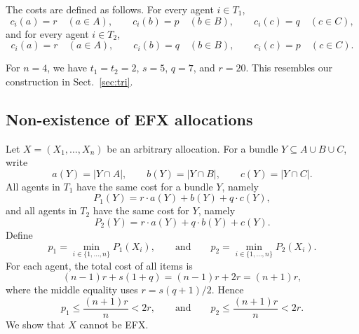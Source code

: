 \documentclass{article}
\theoremstyle{definition}
\begin{document}
The costs are defined as follows. For every agent $i\in T_1$,
\[
    c_i(a)=r \quad(a\in A),
    \qquad
    c_i(b)=p \quad(b\in B),
    \qquad
    c_i(c)=q \quad(c\in C),
\]
and for every agent $i\in T_2$,
\[
    c_i(a)=r \quad(a\in A),
    \qquad
    c_i(b)=q \quad(b\in B),
    \qquad
    c_i(c)=p \quad(c\in C).
\]

For $n=4$, we have $t_1=t_2=2$, $s=5$, $q=7$, and $r=20$.
This resembles our construction in Sect.~\ref{sec:tri}.

\subsection{Non-existence of EFX allocations}
Let $X=(X_1,\ldots,X_n)$ be an arbitrary allocation. For a bundle $Y\subseteq A\cup B\cup C$, write
\[
    a(Y)=|Y\cap A|,
    \qquad
    b(Y)=|Y\cap B|,
    \qquad
    c(Y)=|Y\cap C|.
\]
All agents in $T_1$ have the same cost for a bundle $Y$, namely
\[
    P_1(Y)=r\cdot a(Y)+b(Y)+q\cdot c(Y),
\]
and all agents in $T_2$ have the same cost for $Y$, namely
\[
    P_2(Y)=r\cdot  a(Y)+q\cdot b(Y)+c(Y).
\]
Define
\[
    p_1=\min_{i\in \{1,\ldots,n\}} P_1(X_i),
    \qquad\mbox{and}\qquad
    p_2=\min_{i\in \{1,\ldots,n\}} P_2(X_i).
\]
For each agent, the total cost of all items is
\[
    (n-1)r+s(1+q)=(n-1)r+2r=(n+1)r,
\]
where the middle equality uses $r=s(q+1)/2$. 
Hence
\begin{equation}\label{eqn:2rbound}
    p_1\le \frac{(n+1)r}{n}<2r,
    \qquad\mbox{and}\qquad
    p_2\le \frac{(n+1)r}{n}<2r.
\end{equation}
We show that $X$ cannot be EFX.
\end{document}
